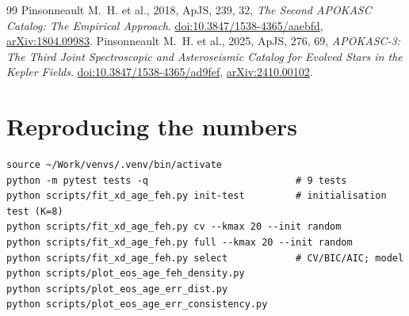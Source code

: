 \documentclass[11pt,a4paper]{article}
\begin{document}
\begin{thebibliography}{99}
 Pinsonneault M.~H. et al., 2018, ApJS, 239, 32, \emph{The Second APOKASC Catalog: The Empirical Approach}. \href{https://doi.org/10.3847/1538-4365/aaebfd}{doi:10.3847/1538-4365/aaebfd}, \href{https://arxiv.org/abs/1804.09983}{arXiv:1804.09983}.
 Pinsonneault M.~H. et al., 2025, ApJS, 276, 69, \emph{APOKASC-3: The Third Joint Spectroscopic and Asteroseismic Catalog for Evolved Stars in the Kepler Fields}. \href{https://doi.org/10.3847/1538-4365/ad9fef}{doi:10.3847/1538-4365/ad9fef}, \href{https://arxiv.org/abs/2410.00102}{arXiv:2410.00102}.
\end{thebibliography}

\appendix
\section{Reproducing the numbers}
\begin{verbatim}
source ~/Work/venvs/.venv/bin/activate
python -m pytest tests -q                          # 9 tests
python scripts/fit_xd_age_feh.py init-test         # initialisation test (K=8)
python scripts/fit_xd_age_feh.py cv --kmax 20 --init random
python scripts/fit_xd_age_feh.py full --kmax 20 --init random
python scripts/fit_xd_age_feh.py select            # CV/BIC/AIC; model
python scripts/plot_eos_age_feh_density.py
python scripts/plot_eos_age_err_dist.py
python scripts/plot_eos_age_err_consistency.py
\end{verbatim}
\end{document}

